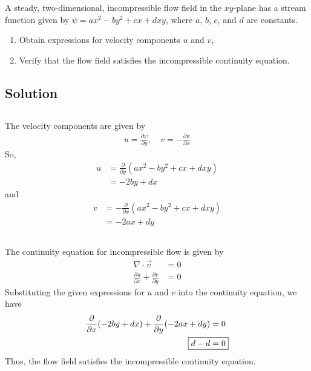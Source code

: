 \section{}
A steady, two-dimensional, incompressible flow field in the $xy$-plane has a stream function given by $\psi = ax^2 - by^2 + cx + dxy$, where $a$, $b$, $c$, and $d$ are constants.
\begin{enumerate}[label=(\alph*)]
    \item Obtain expressions for velocity components $u$ and $v$,
    \item Verify that the flow field satisfies the incompressible continuity equation.
\end{enumerate}

\subsection*{Solution}
\subsection{}
The velocity components are given by
\begin{align*}
    u = \frac{\partial \psi}{\partial y}, \quad v = -\frac{\partial \psi}{\partial x}
\end{align*}
So,
\begin{align*}
    u &= \frac{\partial}{\partial y}(ax^2 - by^2 + cx + dxy) \\
    &= \boxed{-2by + dx}
\end{align*}
and
\begin{align*}
    v &= -\frac{\partial}{\partial x}(ax^2 - by^2 + cx + dxy) \\
    &= \boxed{-2ax + dy}
\end{align*}

\subsection{}
The continuity equation for incompressible flow is given by
\begin{align*}
    \nabla \cdot \vec{v} &= 0 \\
    \frac{\partial u}{\partial x} + \frac{\partial v}{\partial y} &= 0
\end{align*}
Substituting the given expressions for $u$ and $v$ into the continuity equation, we have
\begin{align*}
    \frac{\partial}{\partial x}(-2by + dx) + \frac{\partial}{\partial y}(-2ax + dy) &= 0 \\
    \Aboxed{d - d &= 0}
\end{align*}
Thus, the flow field satisfies the incompressible continuity equation.
